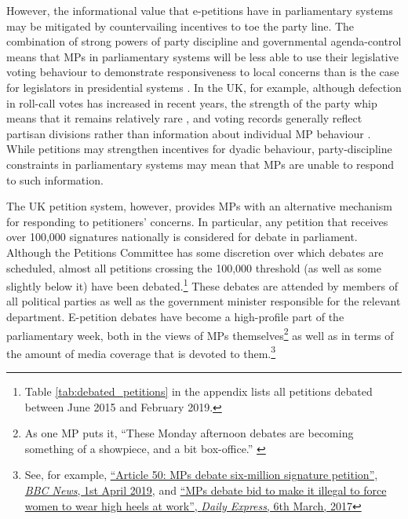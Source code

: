 \documentclass[12pt]{article}
\begin{document}
However, the informational value that e-petitions have in parliamentary systems may be mitigated by countervailing incentives to toe the party line. The combination of strong powers of party discipline and governmental agenda-control means that MPs in parliamentary systems will be less able to use their legislative voting behaviour to demonstrate responsiveness to local concerns than is the case for legislators in presidential systems \citep{carey2007competing}.  In the UK, for example, although defection in roll-call votes has increased in recent years, the strength of the party whip means that it remains relatively rare \citep{cowley_2015}, and voting records generally reflect partisan divisions rather than information about individual MP behaviour \citep{spirling2006uk}. While petitions may strengthen incentives for dyadic behaviour, party-discipline constraints in parliamentary systems may mean that MPs are unable to respond to such information. 

The UK petition system, however, provides MPs with an alternative mechanism for responding to petitioners' concerns. In particular, any petition that receives over 100,000 signatures nationally is considered for debate in parliament. Although the Petitions Committee has some discretion over which debates are scheduled, almost all petitions crossing the 100,000 threshold (as well as some slightly below it) have been debated.\footnote{Table \ref{tab:debated_petitions} in the appendix lists all petitions debated between June 2015 and February 2019.} These debates are attended by members of all political parties as well as the government minister responsible for the relevant department.  E-petition debates have become a high-profile part of the parliamentary week, both in the views of MPs themselves\footnote{As one MP puts it, ``These Monday afternoon debates are becoming something of a showpiece, and a bit box-office.'' \citep{grady2014speech}} as well as in terms of the amount of media coverage that is devoted to them.\footnote{See, for example, \href{https://www.bbc.co.uk/news/uk-politics-47772682}{``Article 50: MPs debate six-million signature petition'', \emph{BBC News}, 1st April 2019}, and \href{https://www.express.co.uk/news/politics/775463/High-heels-work-rule-MPs-debate-illegal}{``MPs debate bid to make it illegal to force women to wear high heels at work'', \emph{Daily Express}, 6th March, 2017}} 
\end{document}
